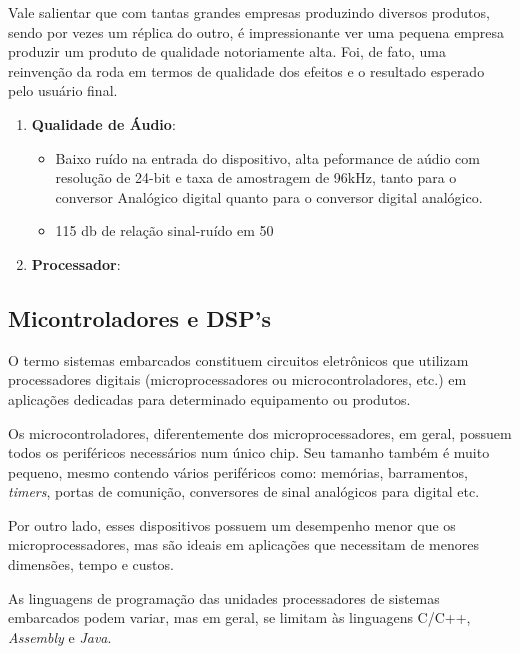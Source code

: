 \begin{enumerate}
				Vale salientar que com tantas grandes empresas produzindo diversos produtos, sendo por vezes um réplica do outro, é impressionante ver uma pequena empresa produzir um produto de qualidade notoriamente alta. Foi, de fato, uma reinvenção da roda em termos de qualidade dos efeitos e o resultado esperado pelo usuário final.
				
				\begin{enumerate}
					\item \textbf{Qualidade de Áudio}: \begin{itemize}
						\item Baixo ruído na entrada do dispositivo, alta peformance de aúdio com resolução de 24-bit  e taxa de amostragem de 96kHz, tanto para o conversor Analógico digital quanto para o conversor digital analógico.
						\item 115 db de relação sinal-ruído em 50%
					\end{itemize}
					
					\item \textbf{Processador}:
				\end{enumerate}
				
				
				 
			\end{enumerate} 
		
	\subsection{Micontroladores e DSP's}

		O termo sistemas embarcados constituem circuitos eletrônicos que utilizam processadores digitais (microprocessadores ou microcontroladores, etc.) em aplicações dedicadas para determinado equipamento ou produtos.
		
		Os microcontroladores, diferentemente dos microprocessadores, em geral, possuem todos os periféricos necessários num único chip. Seu tamanho também é muito pequeno, mesmo contendo vários periféricos como: memórias, barramentos, \textit{timers}, portas de comunição, conversores de sinal analógicos para digital etc.
		
		Por outro lado, esses dispositivos possuem um desempenho menor que os microprocessadores, mas são ideais em aplicações que necessitam de menores dimensões, tempo e custos.
		
		As linguagens de programação das unidades processadores de sistemas embarcados podem variar, mas em geral, se limitam às linguagens C/C++, \textit{Assembly} e \textit{Java}.
		
